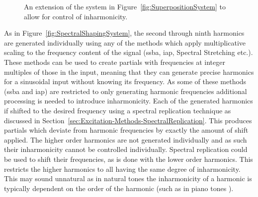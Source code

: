 \begin{figure}[h!]
			\caption{An extension of the system in Figure~\ref{fig:SuperpositionSystem} to allow for control
			         of inharmonicity.}
			\label{fig:InharmonicitySystem}
		\end{figure}

		As in Figure~\ref{fig:SpectralShapingSystem}, the second through ninth harmonics are generated individually
		using any of the methods which apply multiplicative scaling to the frequency content of the signal
		(\acrshort{ssba}, \acrshort{iap}, Spectral Stretching etc.). These methods can be used to create partials
		with frequencies at integer multiples of those in the input, meaning that they can generate precise
		harmonics for a sinusoidal input without knowing its frequency. As some of these methods (\acrshort{ssba}
		and \acrshort{iap}) are restricted to only generating harmonic frequencies additional processing is needed
		to introduce inharmonicity. Each of the generated harmonics if shifted to the desired frequency using a
		spectral replication technique as discussed in Section~\ref{sec:Excitation-Methods-SpectralReplication}.
		This produces partials which deviate from harmonic frequencies by exactly the amount of shift applied. The
		higher order harmonics are not generated individually and as such their inharmonicity cannot be controlled
		individually. Spectral replication could be used to shift their frequencies, as is done with the lower
		order harmonics. This restricts the higher harmonics to all having the same degree of inharmonicity.  This
		may sound unnatural as in natural tones the inharmonicity of a harmonic is typically dependent on the order
		of the harmonic (such as in piano tones \citep{young1952inharmonicity}).

